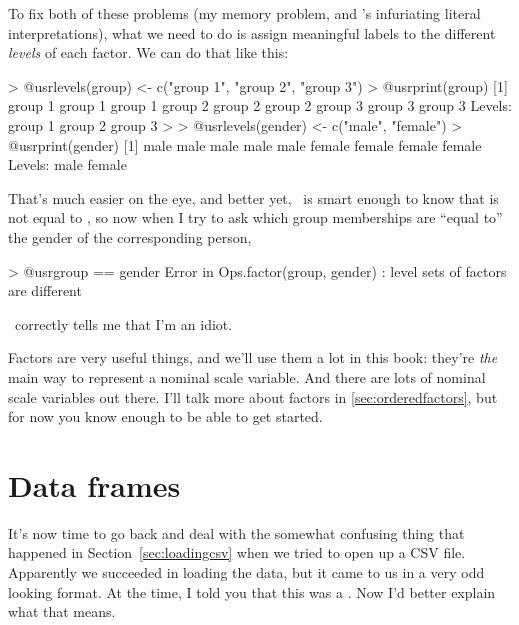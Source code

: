 To fix both of these problems (my memory problem, and \R's infuriating literal interpretations), what we need to do is assign meaningful labels to the different {\it levels} of each factor. We can do that like this:
\begin{rblock1}
> @usr{levels(group) <- c("group 1", "group 2", "group 3")}
> @usr{print(group)}
[1] group 1 group 1 group 1 group 2 group 2 group 2 group 3 group 3 group 3
Levels: group 1 group 2 group 3
> 
> @usr{levels(gender) <- c("male", "female")}
> @usr{print(gender)}
[1] male   male   male   male   male   female female female female
Levels: male female
\end{rblock1}
That's much easier on the eye, and better yet, \R\ is smart enough to know that  is not equal to , so now when I try to ask which group memberships are ``equal to'' the gender of the corresponding person, 
\begin{rblock1}
> @usr{group == gender}
Error in Ops.factor(group, gender) : level sets of factors are different
\end{rblock1}
\R\ correctly tells me that I'm an idiot.



Factors are very useful things, and we'll use them a lot in this book: they're {\it the} main way to represent a nominal scale variable. And there are lots of nominal scale variables out there. I'll talk more about factors in \ref{sec:orderedfactors}, but for now you know enough to be able to get started.




\section{Data frames\label{sec:dataframes}}

It's now time to go back and deal with the somewhat confusing thing that happened in Section~\ref{sec:loadingcsv} when we tried to open up a CSV file. Apparently we succeeded in loading the data, but it came to us in a very odd looking format. At the time, I told you that this was a . Now I'd better explain what that means.




